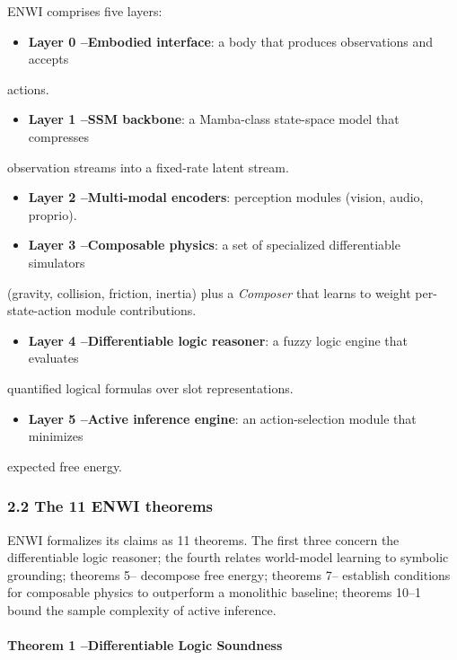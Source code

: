 \documentclass[11pt]{article}
\begin{document}
ENWI comprises five layers:

\begin{itemize}
  \item \textbf{Layer 0 --Embodied interface}: a body that produces observations and accepts
\end{itemize}

  actions.
\begin{itemize}
  \item \textbf{Layer 1 --SSM backbone}: a Mamba-class state-space model that compresses
\end{itemize}

  observation streams into a fixed-rate latent stream.
\begin{itemize}
  \item \textbf{Layer 2 --Multi-modal encoders}: perception modules (vision, audio, proprio).
  \item \textbf{Layer 3 --Composable physics}: a set of specialized differentiable simulators
\end{itemize}

  (gravity, collision, friction, inertia) plus a \textit{Composer} that learns to weight
  per-state-action module contributions.
\begin{itemize}
  \item \textbf{Layer 4 --Differentiable logic reasoner}: a fuzzy logic engine that evaluates
\end{itemize}

  quantified logical formulas over slot representations.
\begin{itemize}
  \item \textbf{Layer 5 --Active inference engine}: an action-selection module that minimizes
\end{itemize}

  expected free energy.

\subsubsection{2.2 The 11 ENWI theorems}

ENWI formalizes its claims as 11 theorems. The first three concern the
differentiable logic reasoner; the fourth relates world-model learning to symbolic
grounding; theorems 5-- decompose free energy; theorems 7-- establish conditions for
composable physics to outperform a monolithic baseline; theorems 10--1 bound the
sample complexity of active inference.

\paragraph{Theorem 1 --Differentiable Logic Soundness}
\end{document}
